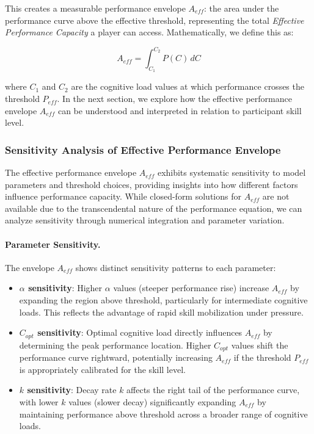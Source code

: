 \documentclass{article}
\begin{document}
This creates a measurable performance envelope $A_{eff}$: the area under the performance curve above the effective
threshold, representing the total \textit{Effective Performance Capacity} a player can access. Mathematically, we define
this as:

\begin{equation}
    A_{eff} = \int_{C_1}^{C_2} P(C) \, dC
\end{equation}

where $C_1$ and $C_2$ are the cognitive load values at which performance crosses the threshold $P_{eff}$.  In the next
section, we explore how the effective performance envelope $A_{eff}$ can be understood and interpreted in relation to
participant skill level.

\subsubsection*{Sensitivity Analysis of Effective Performance Envelope}
The effective performance envelope $A_{eff}$ exhibits systematic sensitivity to model parameters and threshold 
choices, providing insights into how different factors influence performance capacity. While closed-form solutions 
for $A_{eff}$ are not available due to the transcendental nature of the performance equation, we can analyze 
sensitivity through numerical integration and parameter variation.

\paragraph{Parameter Sensitivity.} The envelope $A_{eff}$ shows distinct sensitivity patterns to each parameter:
\begin{itemize}
    \item \textbf{$\alpha$ sensitivity}: Higher $\alpha$ values (steeper performance rise) increase $A_{eff}$ 
    by expanding the region above threshold, particularly for intermediate cognitive loads. This reflects the 
    advantage of rapid skill mobilization under pressure.
    
    \item \textbf{$C_{opt}$ sensitivity}: Optimal cognitive load directly influences $A_{eff}$ by determining 
    the peak performance location. Higher $C_{opt}$ values shift the performance curve rightward, potentially 
    increasing $A_{eff}$ if the threshold $P_{eff}$ is appropriately calibrated for the skill level.
    
    \item \textbf{$k$ sensitivity}: Decay rate $k$ affects the right tail of the performance curve, with 
    lower $k$ values (slower decay) significantly expanding $A_{eff}$ by maintaining performance above threshold 
    across a broader range of cognitive loads.
\end{itemize}
\end{document}
